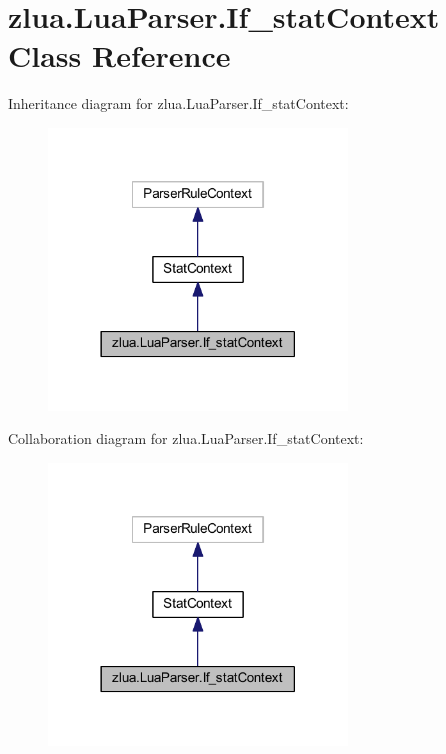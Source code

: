 \hypertarget{classzlua_1_1_lua_parser_1_1_if__stat_context}{}\section{zlua.\+Lua\+Parser.\+If\+\_\+stat\+Context Class Reference}
\label{classzlua_1_1_lua_parser_1_1_if__stat_context}


Inheritance diagram for zlua.\+Lua\+Parser.\+If\+\_\+stat\+Context\+:
\nopagebreak
\begin{figure}[H]
\begin{center}
\leavevmode
\includegraphics[width=225pt]{classzlua_1_1_lua_parser_1_1_if__stat_context__inherit__graph}
\end{center}
\end{figure}


Collaboration diagram for zlua.\+Lua\+Parser.\+If\+\_\+stat\+Context\+:
\nopagebreak
\begin{figure}[H]
\begin{center}
\leavevmode
\includegraphics[width=225pt]{classzlua_1_1_lua_parser_1_1_if__stat_context__coll__graph}
\end{center}
\end{figure}
